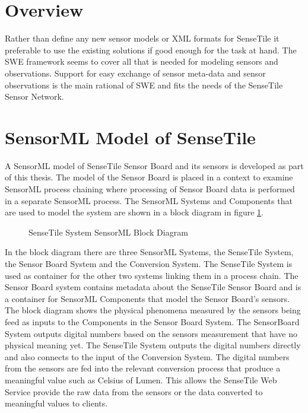 \documentclass[]{final_report}
\begin{document}
\section{Overview}
Rather than define any new sensor models or XML formats for SenseTile it preferable to use the existing solutions if good enough for the task at hand. The SWE framework seems to cover all that is needed for modeling sensors and observations. Support for easy exchange of sensor meta-data and sensor observations is the main rational of SWE and fits the needs of the SenseTile Sensor Network.
\section{SensorML Model of SenseTile}\label{SenseTileModelSec}

A SensorML model of SenseTile Sensor Board and its sensors is developed as part of this thesis. The model of the Sensor Board is placed in a context to examine SensorML process chaining where processing of Sensor Board data is performed in a separate SensorML process.  The SensorML Systems and Components that are used to model the system are shown in a  block diagram in figure \ref{fig:SensorML_SenseTile_System_comp}.


\begin{figure}[h]
\caption{SenseTile System SensorML Block Diagram}\label{fig:SensorML_SenseTile_System_comp}
\end{figure}

In the block diagram there are three SensorML Systems, the SenseTile System, the Sensor Board System and the Conversion System. The SenseTile System is used as container for the other two systems linking them in a process chain. The Sensor Board system contains metadata about the SenseTile Sensor Board and is a container for SensorML Components that model the Sensor Board's sensors. The block diagram shows the physical phenomena measured by the sensors being feed as inputs to the Components in the Sensor Board System. The SensorBoard System outputs digital numbers based on the sensors measurement that have no physical meaning yet. The SenseTile System outputs the digital numbers directly and also connects to the input of the Conversion System. The digital numbers from the sensors are fed into the relevant conversion process that produce a meaningful value such as Celsius of Lumen. This allows the SenseTile Web Service provide the raw data from the sensors or the data converted to meaningful values to clients.
\end{document}

